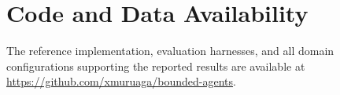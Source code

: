 \documentclass[sigconf,nonacm]{acmart}
\begin{document}
\section{Code and Data Availability}\label{app:artifacts}

The reference implementation, evaluation harnesses, and all domain configurations supporting the reported results are available at \url{https://github.com/xmuruaga/bounded-agents}.



\end{document}
